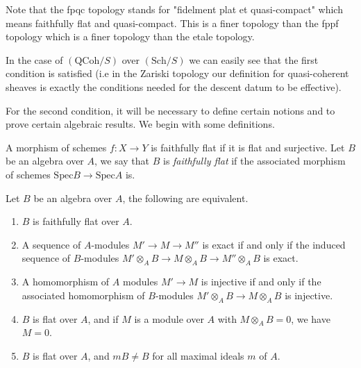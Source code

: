 \noindent
Note that the fpqc topology stands for "fidelment plat et quasi-compact" which
means faithfully flat and quasi-compact.  This is a finer topology than the
fppf topology which is a finer topology than the etale topology.


\medskip\noindent In the case of $(\text{QCoh}/S)$ over
$(\text{Sch}/S)$ we can easily see that the first condition is
satisfied (i.e in the Zariski topology our definition for
quasi-coherent sheaves is exactly the conditions needed for the
descent datum to be effective).

\medskip\noindent For the second condition, it will be necessary to
define certain notions and to prove certain algebraic results.  We
begin with some definitions.

\begin{definition}
\label{definition-faithfully-flat}
A morphism of schemes $f: X \rightarrow Y$ is faithfully flat if it is flat
and surjective.  Let $B$ be an algebra over $A$, we say that $B$ is
{\it faithfully flat} if the associated morphism of schemes
$\text{Spec} B \rightarrow \text{Spec} A$ is. 
\end{definition}

\begin{proposition}
\label{proposition-faithfully-flat}
Let $B$ be an algebra over $A$, the following are equivalent.
\begin{enumerate}
\item $B$ is faithfully flat over $A$.
\item A sequence of $A$-modules $M' \rightarrow M \rightarrow M''$ is exact
if and only if the induced sequence of $B$-modules
$M' \otimes_A B \rightarrow M \otimes_A B \rightarrow M'' \otimes_A B$
is exact.
\item A homomorphism of $A$ modules $M' \rightarrow M$ is injective if and
only if the associated homomorphism of $B$-modules
$M' \otimes_A B \rightarrow M \otimes_A B$ is injective.
\item $B$ is flat over $A$, and if $M$ is a module over $A$ with
$M \otimes_A B = 0$, we have $M = 0$.
\item $B$ is flat over $A$, and $mB \neq B$ for all maximal ideals $m$
of $A$.	
\end{enumerate}
\end{proposition}

